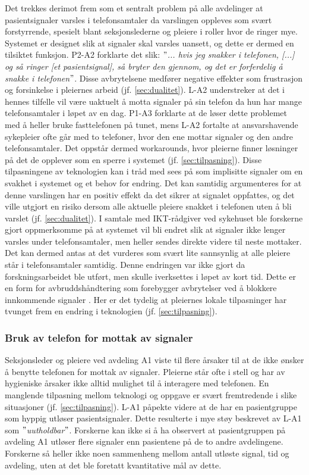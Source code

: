 \noindent
Det trekkes derimot frem som et sentralt problem på alle avdelinger at pasientsignaler varsles i telefonsamtaler da varslingen oppleves som svært forstyrrende, spesielt blant seksjonslederne og pleiere i roller hvor de ringer mye. Systemet er designet slik at signaler skal varsles uansett, og dette er dermed en tilsiktet funksjon. P2-A2 forklarte det slik: \textit{ $"$... hvis jeg snakker i telefonen, [...] og så ringer [et pasientsignal], så bryter den gjennom, og det er forferdelig å snakke i telefonen$"$}. Disse avbrytelsene medfører negative effekter som frustrasjon og forsinkelse i pleiernes arbeid (jf. \ref{sec:dualitet}). L-A2 understreker at det i hennes tilfelle vil være uaktuelt å motta signaler på sin telefon da hun har mange telefonsamtaler i løpet av en dag. P1-A3 forklarte at de løser dette problemet med å heller bruke fasttelefonen på tunet, mens L-A2 fortalte at ansvarshavende sykepleier ofte går med to telefoner, hvor den ene mottar signaler og den andre telefonsamtaler. Det oppstår dermed workarounds, hvor pleierne finner løsninger på det de opplever som en sperre i systemet (jf. \ref{sec:tilpasning}). Disse tilpasningene av teknologien kan i tråd med \citet{Coiera07} sees på som implisitte signaler om en svakhet i systemet og et behov for endring. Det kan samtidig argumenteres for at denne varslingen har en positiv effekt da det sikrer at signalet oppfattes, og det ville utgjort en risiko dersom alle aktuelle pleiere snakket i telefonen uten å bli varslet (jf. \ref{sec:dualitet}). I samtale med IKT-rådgiver ved sykehuset ble forskerne gjort oppmerksomme på at systemet vil bli endret slik at signaler ikke lenger varsles under telefonsamtaler, men heller sendes direkte videre til neste mottaker. Det kan dermed antas at det vurderes som svært lite sannsynlig at alle pleiere står i telefonsamtaler samtidig. Denne endringen var ikke gjort da forskningsarbeidet ble utført, men skulle iverksettes i løpet av kort tid. Dette er en form for avbruddshåndtering som forebygger avbrytelser ved å blokkere innkommende signaler \citep{Grandhi10}. Her er det tydelig at pleiernes lokale tilpasninger har tvunget frem en endring i teknologien (jf. \ref{sec:tilpasning}).

\subsubsection{Bruk av telefon for mottak av signaler}
Seksjonsleder og pleiere ved avdeling A1 viste til flere årsaker til at de ikke ønsker å benytte telefonen for mottak av signaler. Pleierne står ofte i stell og har av hygieniske årsaker ikke alltid mulighet til å interagere med telefonen. En manglende tilpasning mellom teknologi og oppgave er svært fremtredende i slike situasjoner (jf. \ref{sec:tilpasning}). L-A1 påpekte videre at de har en pasientgruppe som hyppig utløser pasientsignaler. Dette resulterte i mye støy beskrevet av L-A1 som \textit{$"$uutholdbar$"$}. Forskerne kan ikke si å ha observert at pasientgruppen på avdeling A1 utløser flere signaler enn pasientene på de to andre avdelingene. Forskerne så heller ikke noen sammenheng mellom antall utløste signal, tid og avdeling, uten at det ble foretatt kvantitative mål av dette.

